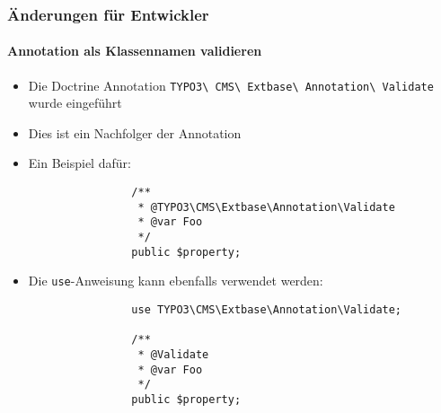 
\begin{frame}[fragile]
	\frametitle{Änderungen für Entwickler }
	\framesubtitle{Annotation als Klassennamen validieren}

	\lstset{basicstyle=\tiny\ttfamily}

	\begin{itemize}
		\item Die Doctrine Annotation
			\texttt{TYPO3\textbackslash
				CMS\textbackslash
				Extbase\textbackslash
				Annotation\textbackslash
				Validate} wurde eingeführt
		\item Dies ist ein Nachfolger der Annotation \texttt{\@validate} 
		\item Ein Beispiel dafür:

			\begin{lstlisting}
				/**
				 * @TYPO3\CMS\Extbase\Annotation\Validate
				 * @var Foo
				 */
				public $property;
			\end{lstlisting}

		\item Die \texttt{use}-Anweisung kann ebenfalls verwendet werden:

			\begin{lstlisting}
				use TYPO3\CMS\Extbase\Annotation\Validate;

				/**
				 * @Validate
				 * @var Foo
				 */
				public $property;
			\end{lstlisting}

	\end{itemize}

\end{frame}


